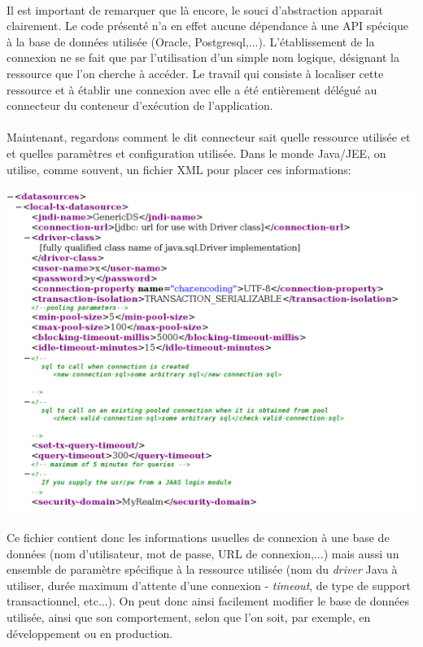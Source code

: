 {  \paragraph{} Il est important de remarquer que là encore, le souci d'abstraction apparait
  clairement. Le code présenté n'a en effet aucune dépendance à une API spécique à la base de
  données utilisée (Oracle, Postgresql,...). L'établissement de la connexion ne se fait que par
  l'utilisation d'un simple nom logique, désignant la ressource que l'on cherche à accéder. Le
  travail qui consiste à localiser cette ressource et à établir une connexion avec elle a été
  entièrement délégué au connecteur du conteneur d'exécution de l'application.

  \paragraph{} Maintenant, regardons comment le dit connecteur sait quelle ressource utilisée et
  et quelles paramètres et configuration utilisée. Dans le monde Java/JEE, on utilise, comme
  souvent, un fichier XML pour placer ces informations:

  \begin{center}
    \includegraphics[scale=0.3]{img/datasource.png}
  \end{center}

  \paragraph{} Ce fichier contient donc les informations usuelles de connexion à une base de données
  (nom d'utilisateur, mot de passe, URL de connexion,...) mais aussi un ensemble de paramètre
  spécifique à la ressource utilisée (nom du \textit{driver} Java à utiliser, durée maximum d'attente
  d'une connexion - \textit{timeout}, de type de support transactionnel, etc...). On peut donc ainsi
  facilement modifier le base de données utilisée, ainsi que son comportement, selon que l'on soit,
  par exemple, en développement ou en production.
}

